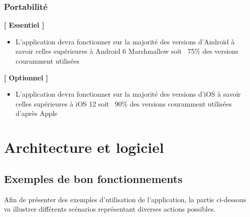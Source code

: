 \documentclass{article}
\begin{document}
		\subsubsection{Portabilité}
		\textbf{[ Essentiel ]}
		\begin{itemize}
			\item L'application devra fonctionner sur la majorité des versions d'Android à savoir celles supérieures à Android 6 Marshmallow soit ~75\% des versions couramment utilisées \cite{AndroidVersion2019}
		\end{itemize}
		\textbf{[ Optionnel ]}
		\begin{itemize}
			\item L'application devra fonctionner sur la majorité des versions d'iOS à savoir celles supérieures à iOS 12 soit ~90\% des versions couramment utilisées d'après Apple  \cite{iOSVersion2019}
		\end{itemize}

		\section{Architecture et logiciel}
	    \subsection{Exemples de bon fonctionnements}\label{good_use}
	    Afin de présenter des exemples d'utilisation de l'application, la partie ci-dessous va illustrer différents scénarios représentant diverses actions possibles.\newline
	    
\end{document}
